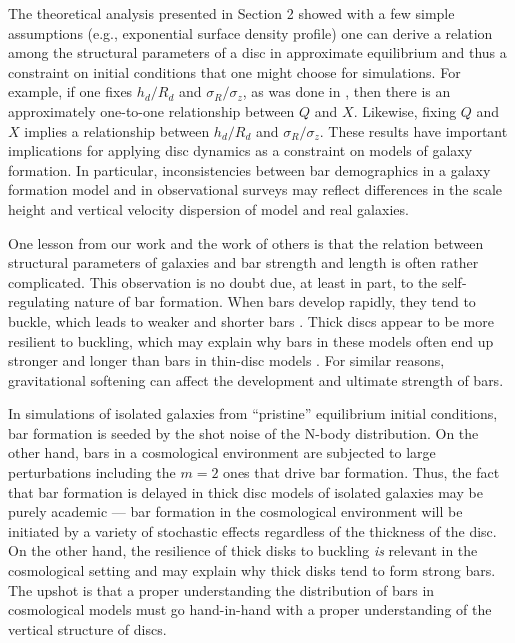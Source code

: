 The theoretical analysis presented in Section 2 showed with a few
simple assumptions (e.g., exponential surface density profile) one can
derive a relation among the structural parameters of a disc in
approximate equilibrium and thus a constraint on initial conditions
that one might choose for simulations.  For example, if one fixes
$h_d/R_d$ and $\sigma_R/\sigma_z$, as was done in
\citet{YurinSpringelStellarDisks}, then there is an approximately
one-to-one relationship between $Q$ and $X$.  Likewise, fixing $Q$ and
$X$ implies a relationship between $h_d/R_d$ and $\sigma_R/\sigma_z$.
These results have important implications for applying disc dynamics
as a constraint on models of galaxy formation.  In particular,
inconsistencies between bar demographics in a galaxy formation model
and in observational surveys may reflect differences in the scale
height and vertical velocity dispersion of model and real galaxies.

One lesson from our work and the work of others is that the relation
between structural parameters of galaxies and bar strength and length
is often rather complicated.  This observation is no doubt due, at
least in part, to the self-regulating nature of bar formation.  When
bars develop rapidly, they tend to buckle, which leads to weaker and
shorter bars \citep{VP2004}.  Thick discs appear to be more resilient
to buckling, which may explain why bars in these models often end up
stronger and longer than bars in thin-disc models \citep{Klypin2009}.
For similar reasons, gravitational softening can affect the
development and ultimate strength of bars.

In simulations of isolated galaxies from ``pristine'' equilibrium
initial conditions, bar formation is seeded by the shot noise of the
N-body distribution.  On the other hand, bars in a cosmological
environment are subjected to large perturbations including the $m=2$
ones that drive bar formation.  Thus, the fact that bar formation is
delayed in thick disc models of isolated galaxies may be purely
academic --- bar formation in the cosmological environment will be
initiated by a variety of stochastic effects regardless of the
thickness of the disc.  On the other hand, the resilience of thick
disks to buckling {\it is} relevant in the cosmological setting and
may explain why thick disks tend to form strong bars.  The upshot is 
that a proper understanding the distribution of bars in cosmological models
must go hand-in-hand with a proper understanding of the vertical 
structure of discs.

